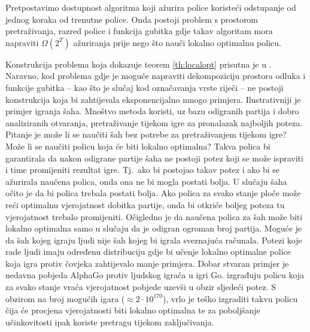 \begin{theorem} \label{th:localopt}

  Pretpostavimo dostupnost algoritma koji ažurira police koristeći odstupanje od
  jednog koraka od trenutne police. Onda postoji problem s prostorom
  pretraživanja, razred police i funkcija gubitka gdje takav algoritam mora
  napraviti $\Omega(2^T)$ ažuriranja prije nego što nauči lokalno optimalnu
  policu.

\end{theorem}

Konstrukcija problema koja dokazuje teorem \ref{th:localopt} prisutna je u
\citep{daume15lols}. Naravno, kod problema gdje je moguće napraviti
dekompoziciju prostora odluka i funkcije gubitka -- kao što je slučaj kod
označavanja vrste riječi -- ne postoji konstrukcija koja bi zahtijevala
eksponencijalno mnogo primjera. Ilustrativniji je primjer igranja šaha. Mnoštvo
metoda koristi, uz bazu odigranih partija i dobro analiziranih otvaranja,
pretraživanje tijekom igre za pronalazak najboljih poteza. Pitanje je može li se
naučiti šah bez potrebe za pretraživanjem tijekom igre? Može li se naučiti
policu koja će biti lokalno optimalna? Takva polica bi garantirala da nakon
odigrane partije šaha ne postoji potez koji se može ispraviti i time promijeniti
rezultat igre. Tj.~ako bi postojao takav potez i ako bi se ažurirala naučena
polica, onda ona ne bi mogla postati bolja. U slučaju šaha očito je da bi polica
trebala postati bolja. Ako polica za svako stanje ploče može reći optimalnu
vjerojatnost dobitka partije, onda bi otkriće boljeg poteza tu vjerojatnost
trebalo promijeniti. Očigledno je da naučena polica za šah može biti lokalno
optimalna samo u slučaju da je odigran ogroman broj partija. Moguće je da šah
kojeg igraju ljudi nije šah kojeg bi igrala sveznajuća računala. Potezi koje
rade ljudi imaju određenu distribuciju gdje bi učenje lokalno optimalne police
koja igra protiv čovjeka zahtijevalo manje primjera. Dobar stvaran primjer je
nedavna pobjeda AlphaGo protiv ljudskog igrača u igri Go.
\citet{silver2016mastering} izgrađuju policu koja za svako stanje vraća
vjerojatnost pobjede uzevši u obzir sljedeći potez. S obzirom na broj mogućih
igara ($\approx 2\cdot10^{170}$), vrlo je teško izgraditi takvu policu čija će
procjena vjerojatnosti biti lokalno optimalna te za poboljšanje učinkovitosti
ipak koriste pretragu tijekom zaključivanja.
